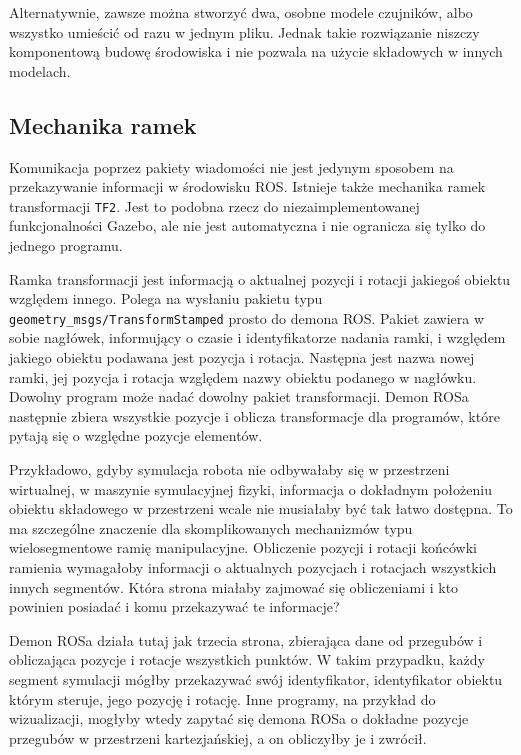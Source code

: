 		Alternatywnie, zawsze można stworzyć dwa, osobne modele czujników, albo wszystko umieścić od razu w jednym pliku.
		Jednak takie rozwiązanie niszczy komponentową budowę środowiska i nie pozwala na użycie składowych w innych modelach.
		
	\subsection{Mechanika ramek}
	\label{sec:frames}
	Komunikacja poprzez pakiety wiadomości nie jest jedynym sposobem na przekazywanie informacji w środowisku ROS.
	Istnieje także mechanika ramek transformacji \texttt{TF2}.
	Jest to podobna rzecz do niezaimplementowanej funkcjonalności Gazebo, ale nie jest automatyczna i nie ogranicza się tylko do jednego programu.
	
	Ramka transformacji jest informacją o aktualnej pozycji i rotacji jakiegoś obiektu względem innego.
	Polega na wysłaniu pakietu typu \texttt{geometry\_msgs/TransformStamped} prosto do demona ROS.
	Pakiet zawiera w sobie nagłówek, informujący o czasie i identyfikatorze nadania ramki, i względem jakiego obiektu podawana jest pozycja i rotacja.
	Następna jest nazwa nowej ramki, jej pozycja i rotacja względem nazwy obiektu podanego w nagłówku.
	Dowolny program może nadać dowolny pakiet transformacji.
	Demon ROSa następnie zbiera wszystkie pozycje i oblicza transformacje dla programów, które pytają się o względne pozycje elementów.
	
	Przykładowo, gdyby symulacja robota nie odbywałaby się w przestrzeni wirtualnej, w maszynie symulacyjnej fizyki, 
	informacja o dokładnym położeniu obiektu składowego w przestrzeni wcale nie musiałaby być tak łatwo dostępna.
	To ma szczególne znaczenie dla skomplikowanych mechanizmów typu wielosegmentowe ramię manipulacyjne.
	Obliczenie pozycji i rotacji końcówki ramienia wymagałoby informacji o aktualnych pozycjach i rotacjach wszystkich innych segmentów.
	Która strona miałaby zajmować się obliczeniami i kto powinien posiadać i komu przekazywać te informacje?
	
	Demon ROSa działa tutaj jak trzecia strona, zbierająca dane od przegubów i obliczająca pozycje i rotacje wszystkich punktów.
	W takim przypadku, każdy segment symulacji mógłby przekazywać swój identyfikator, identyfikator obiektu którym steruje, jego pozycję i rotację.
	Inne programy, na przykład do wizualizacji, mogłyby wtedy zapytać się demona ROSa o dokładne pozycje przegubów w przestrzeni kartezjańskiej, a on obliczyłby je i zwrócił.
	
